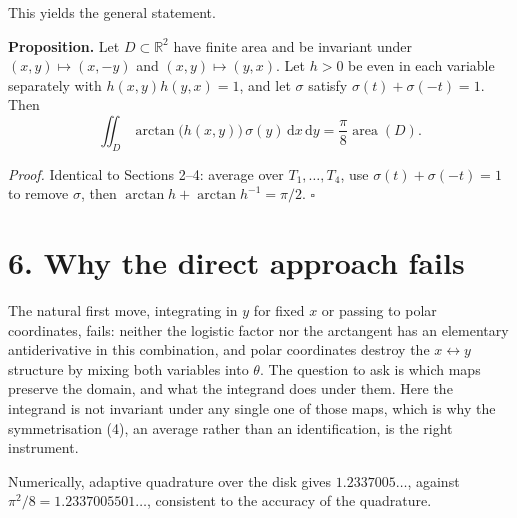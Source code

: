 \documentclass[12pt]{article}
\newcommand{\dd}{\,\mathrm{d}}
\newcommand{\D}{D}
\begin{document}
This yields the general statement.

\textbf{Proposition.}
Let \(\D\subset\mathbb R^2\) have finite area and be invariant under
\((x,y)\mapsto(x,-y)\) and \((x,y)\mapsto(y,x)\). Let \(h>0\) be even in
each variable separately with \(h(x,y)h(y,x)=1\), and let \(\sigma\)
satisfy \(\sigma(t)+\sigma(-t)=1\). Then
\[
\boxed{\displaystyle
\iint_\D \arctan\bigl(h(x,y)\bigr)\,\sigma(y)\dd x\dd y
=\frac\pi8\operatorname{area}(\D).}
\tag{9}
\]

\textit{Proof.} Identical to Sections 2--4: average over
\(T_1,\dots,T_4\), use \(\sigma(t)+\sigma(-t)=1\) to remove \(\sigma\),
then \(\arctan h+\arctan h^{-1}=\pi/2\). \(\square\)

\section*{6. Why the direct approach fails}

The natural first move, integrating in \(y\) for fixed \(x\) or
passing to polar coordinates, fails: neither the logistic factor nor
the arctangent has an elementary antiderivative in this combination, and
polar coordinates destroy the \(x\leftrightarrow y\) structure by mixing
both variables into \(\theta\). The question to ask is which maps preserve
the domain, and what the integrand does under them. Here the integrand is
not invariant under any single one of those maps, which is why the
symmetrisation (4), an average rather than an identification, is the right
instrument.

Numerically, adaptive quadrature over the disk gives
\(1.2337005\ldots\), against
\(\pi^2/8=1.2337005501\ldots\), consistent to the accuracy of the
quadrature.
\end{document}
